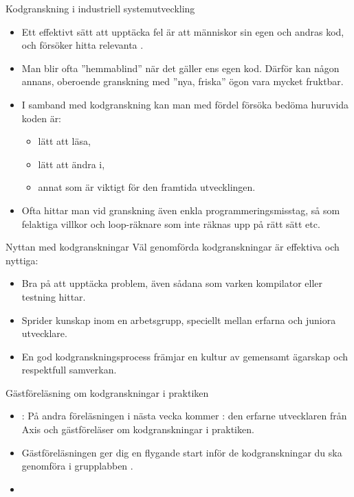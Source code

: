 \begin{Slide}{Kodgranskning i industriell systemutveckling}
\begin{itemize}
\item Ett effektivt sätt att upptäcka fel är att människor  sin egen och andras kod, och försöker hitta relevanta . 
\item Man blir ofta ''hemmablind'' när det gäller ens egen kod. Därför kan någon annans, oberoende granskning med ''nya, friska'' ögon vara mycket fruktbar. 
\item I samband med kodgranskning kan man med fördel försöka bedöma  huruvida koden är:
\begin{itemize}
\item lätt att läsa, 
\item lätt att ändra i,  
\item annat som är viktigt för den framtida utvecklingen.
\end{itemize}
\item Ofta hittar man vid granskning även enkla programmeringsmisstag, så som felaktiga villkor och loop-räknare som inte räknas upp på rätt sätt etc.
\end{itemize}
\end{Slide}

\begin{Slide}{Nyttan med kodgranskningar}
Väl genomförda kodgranskningar är effektiva och nyttiga:
\begin{itemize}
\item Bra på att upptäcka problem, även sådana som varken kompilator eller testning hittar.
\item Sprider kunskap inom en arbetsgrupp, speciellt mellan erfarna och juniora utvecklare.
\item En god kodgranskningsprocess främjar en kultur av gemensamt ägarskap och respektfull samverkan.
\end{itemize}
\end{Slide}




\ifkompendium\else
\begin{Slide}{Gästföreläsning om kodgranskningar i praktiken}
\begin{itemize}
\item {}: På andra föreläsningen i nästa vecka kommer : den erfarne utvecklaren  från Axis och gästföreläser om kodgranskningar i praktiken. 
\item Gästföreläsningen ger dig en flygande start inför de kodgranskningar du ska genomföra i grupplabben .
\item {}
\end{itemize}
\end{Slide}
\fi
